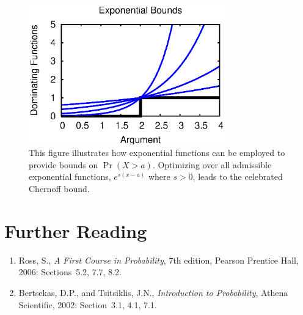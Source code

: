 \begin{figure}[ht]
\begin{center}
\includegraphics[width=8.5cm]{Figures/10chapter/chernoff_bound}
\end{center}
\caption{This figure illustrates how exponential functions can be employed to provide bounds on $\Pr (X > a)$.
Optimizing over all admissible exponential functions, $e^{s(x-a)}$ where $s > 0$, leads to the celebrated Chernoff bound.}
\label{figure:ChernoffBound}
\end{figure}


%


\section*{Further Reading}

\begin{small}
\begin{enumerate}
\item Ross, S., \emph{A First Course in Probability}, 7th edition, Pearson Prentice Hall, 2006: Sections~5.2, 7.7, 8.2.
\item Bertsekas, D.P., and Tsitsiklis, J.N., \emph{Introduction to Probability}, Athena Scientific, 2002: Section~3.1, 4.1, 7.1.
\end{enumerate}
\end{small}

